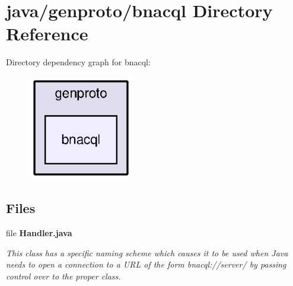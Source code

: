 \section{java/genproto/bnacql Directory Reference}
\label{dir_7d2d6ec2c0f74019ddb571c371755f50}
Directory dependency graph for bnacql\+:\nopagebreak
\begin{figure}[H]
\begin{center}
\leavevmode
\includegraphics[width=130pt]{dir_7d2d6ec2c0f74019ddb571c371755f50_dep}
\end{center}
\end{figure}
\subsection*{Files}
\begin{DoxyCompactItemize}
\item 
file {\bf Handler.\+java}
\begin{DoxyCompactList}\small\item\em This class has a specific naming scheme which causes it to be used when Java needs to open a connection to a U\+R\+L of the form bnacql\+://server/ by passing control over to the proper class. \end{DoxyCompactList}\end{DoxyCompactItemize}
